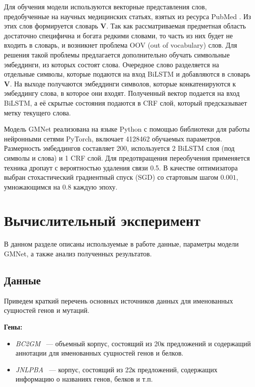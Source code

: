 \documentclass[12pt, a4paper]{article} %
\begin{document}
Для обучения модели используются векторные представления слов, предобученные на научных медицинских статьях, взятых из ресурса PubMed \cite{pubmed}. Из этих слов формируется словарь $\mathbf{V}$. Так как рассматриваемая предметная область достаточно специфична и богата редкими словами, то часть из них будет не входить в словарь, и возникнет проблема OOV (out of vocabulary) слов. Для решения такой проблемы предлагается дополнительно обучать символьные эмбеддинги, из которых состоят слова. Очередное слово разделяется на отдельные символы, которые подаются на вход BiLSTM и добавляются в словарь $\mathbf{V}$. На выходе получаются эмбеддинги символов, которые конкатенируются к эмбеддингу слова, в которое они входят. Полученный вектор подается на вход BiLSTM, а её скрытые состояния подаются в CRF слой, который предсказывает метку текущего слова. 

Модель GMNet реализована на языке Python с помощью библиотеки для работы нейронными сетями PyTorch, включает 4128462 обучаемых параметров. Размерность эмбеддингов составляет 200, используется 2 BiLSTM слоя (под символы и слова) и 1 CRF слой. Для предотвращения переобучения применяется техника дропаут с вероятностью удаления связи 0.5. В качестве оптимизатора выбран стохастический градиентный спуск (SGD) со стартовым шагом $0.001$, умножающимся на $0.8$ каждую эпоху.




\newpage
\section{Вычислительный эксперимент}
В данном разделе описаны используемые в работе данные, параметры модели GMNet, а также анализ полученных результатов.

\subsection{Данные}
	Приведем краткий перечень основных источников данных для именованных сущностей генов и мутаций.
	
	\bigskip
	
	\textbf{Гены:}
	\begin{itemize}
		\item \textit{BC2GM} \cite{pmid15960837} ~--- объемный корпус, состоящий из 20к предложений и содержащий аннотации для именованных сущностей генов и белков.
		\item \textit{JNLPBA} \cite{Huang2019} ~--- корпус, состоящий из 22к предложений, содержащих информацию о названиях генов, белков и т.п. 
	\end{itemize}
\end{document}
